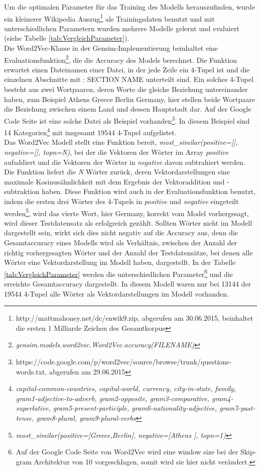 \documentclass[12pt,a4paper]{report}
\begin{document}
Um die optimalen Parameter für das Training des Modells herauszufinden, wurde ein kleinerer Wikipedia Auszug\footnote{http://mattmahoney.net/dc/enwik9.zip, abgerufen am 30.06.2015, beinhaltet die ersten 1 Milliarde Zeichen des Gesamtkorpus} als Trainingsdaten benutzt und mit unterschiedlichen Parametern wurden mehrere Modelle gelernt und evaluiert (siehe Tabelle \ref{tab:VergleichParameter}).\\
Die Word2Vec-Klasse in der Gensim-Implementierung beinhaltet eine Evaluationsfunktion\footnote{\textit{gensim.models.word2vec.Word2Vec.accuracy(FILENAME)}}, die die Accuracy des Models berechnet. Die Funktion erwartet einen Dateinamen einer Datei, in der jede Zeile ein 4-Tupel ist und die einzelnen Abschnitte mit \glqq : SECTION NAME\grqq{} unterteilt sind. Ein solches 4-Tupel besteht aus zwei Wortpaaren, deren Worte die gleiche Beziehung untereinander haben, zum Beispiel \glqq Athens Greece Berlin Germany\grqq , hier stellen beide Wortpaare die Beziehung zwischen einem Land und dessen Hauptstadt dar. Auf der Google Code Seite ist eine solche Datei als Beispiel vorhanden\footnote{https://code.google.com/p/word2vec/source/browse/trunk/questions-words.txt, abgerufen am 29.06.2015}. In diesem Beispiel sind 14 Kategorien\footnote{\textit{capital-common-countries, capital-world, currency, city-in-state, family, gram1-adjective-to-adverb, gram2-opposite, gram3-comparative, gram4-superlative, gram5-present-participle, gram6-nationality-adjective, gram7-past-tense, gram8-plural, gram9-plural-verbs}} mit insgesamt 19544 4-Tupel aufgelistet.\\
Das Word2Vec Modell stellt eine Funktion bereit, \textit{most\_similar(positive=[], negative=[], topn=N)}, bei der die Vektoren der Wörter im Array \textit{positive} aufaddiert und die Vektoren der Wörter in \textit{negative} davon subtrahiert werden. Die Funktion liefert die \textit{N} Wörter zurück, deren Vektordarstellungen eine maximale Kosinusähnlichkeit mit dem Ergebnis der Vektoraddition und -subtraktion haben. Diese Funktion wird auch in der Evaluationsfunktion benutzt, indem die ersten drei Wörter des 4-Tupels in \textit{positive} und \textit{negative} eingeteilt werden\footnote{\textit{most\_similar(positive=[\grq Greece\grq,\grq Berlin\grq], negative=[\grq Athens \grq], topn=1)}}, wird das vierte Wort, hier \glqq Germany\grqq, korrekt vom Model vorhergesagt, wird dieser Testdatensatz als erfolgreich gezählt. Sollten Wörter nicht im Modell dargestellt sein, wirkt sich dies nicht negativ auf die Accuracy aus, denn die Gesamtaccuracy eines Modells wird als Verhältnis, zwischen der Anzahl der richtig vorhergesagten Wörter und der Anzahl der Testdatensätze, bei denen alle Wörter eine Vektordarstellung im Modell haben, dargestellt. In der Tabelle \ref{tab:VergleichParameter} werden die unterschiedlichen Parameter\footnote{Auf der Google Code Seite von Word2Vec wird eine window size bei der Skip-gram Architektur von 10 vorgeschlagen, somit wird sie hier nicht verändert.} und die erreichte Gesamtaccuracy dargestellt. In diesem Modell waren nur bei 13144 der 19544 4-Tupel alle Wörter als Vektordarstellungen im Modell vorhanden.
\end{document}
